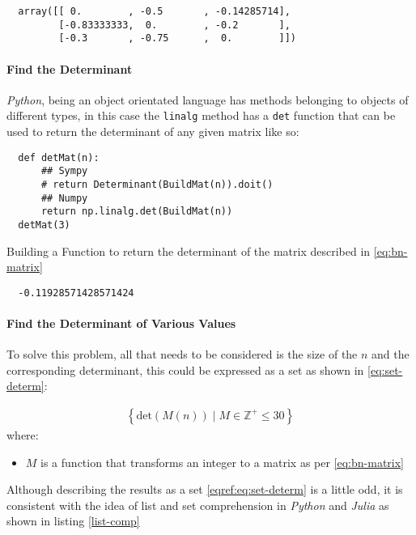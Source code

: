 \documentclass[11pt]{article}
\begin{document}
\begin{verbatim}
  array([[ 0.        , -0.5       , -0.14285714],
         [-0.83333333,  0.        , -0.2       ],
         [-0.3       , -0.75      ,  0.        ]])
\end{verbatim}

\paragraph{Find the Determinant}
\label{find-the-determinant}
\emph{Python}, being an object orientated language has methods belonging to objects of different types, in this case the \texttt{linalg} method has a \texttt{det} function that can be used to return the determinant of any given matrix like so:

\begin{listing}[htbp]
\begin{verbatim}
  def detMat(n):
      ## Sympy
      # return Determinant(BuildMat(n)).doit()
      ## Numpy
      return np.linalg.det(BuildMat(n))
  detMat(3)
\end{verbatim}
\caption{\label{make-det}Building a Function to return the determinant of the matrix described in \eqref{eq:bn-matrix}}
\end{listing}

\begin{verbatim}
  -0.11928571428571424
\end{verbatim}

\paragraph{Find the Determinant of Various Values}
\label{find-the-determinant-of-various-values}
To solve this problem, all that needs to be considered is the size of the \(n\) and the corresponding determinant, this could be expressed as a set as shown in \eqref{eq:set-determ}:

\begin{align}
\left\{ \mathrm{det}\left( M(n) \right) \mid M \in \mathbb{Z}^{+} \leq 30  \right\} \label{eqref:eq:set-determ}
\end{align}
where:
\begin{itemize}
\item \(M\) is a function that transforms an integer to a matrix as per \eqref{eq:bn-matrix}
\end{itemize}

Although describing the results as a set \eqref{eqref:eq:set-determ} is a little odd, it is consistent with the idea of list and set comprehension in \emph{Python} \cite{DataStructuresPython} and \emph{Julia} \cite{MultidimensionalArraysJulia} as shown in listing \ref{list-comp}
\end{document}
